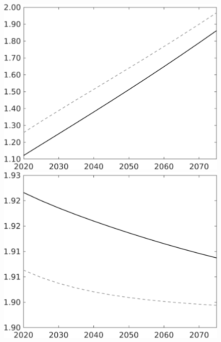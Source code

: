 \documentclass[12pt]{article}
\begin{document}
\begin{figure}[h!!]
\begin{minipage}[]{0.32\textwidth}
	\end{minipage}		
\begin{minipage}[]{0.32\textwidth}
\includegraphics[width=1\textwidth]{../../codding_model/own_basedOnFried/optimalPol_010922_revision/figures/all_13Sept22/LevTaufNoTauf_TaulCalib_Equlab_regime0_wl_spillover0_nsk0_xgr0_knspil1_sep1_LFlimit0_emsbase0_countec0_GovRev0_etaa0.79_lgd0.png}
\end{minipage}		
\begin{minipage}[]{0.32\textwidth}
\includegraphics[width=1\textwidth]{../../codding_model/own_basedOnFried/optimalPol_010922_revision/figures/all_13Sept22/LevTaufNoTauf_TaulCalib_Equlab_regime0_whwl_spillover0_nsk0_xgr0_knspil1_sep1_LFlimit0_emsbase0_countec0_GovRev0_etaa0.79_lgd0.png}

\end{minipage}
\end{figure}
\end{document}
